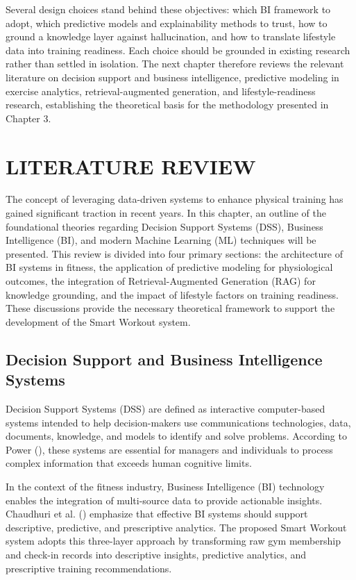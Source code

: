 \documentclass{aitthesis}
\begin{document}
Several design choices stand behind these objectives: which BI framework to adopt, which predictive models and explainability methods to trust, how to ground a knowledge layer against hallucination, and how to translate lifestyle data into training readiness. Each choice should be grounded in existing research rather than settled in isolation. The next chapter therefore reviews the relevant literature on decision support and business intelligence, predictive modeling in exercise analytics, retrieval-augmented generation, and lifestyle-readiness research, establishing the theoretical basis for the methodology presented in Chapter 3.

\chapter{LITERATURE REVIEW}

The concept of leveraging data-driven systems to enhance physical training has gained significant traction in recent years. In this chapter, an outline of the foundational theories regarding Decision Support Systems (DSS), Business Intelligence (BI), and modern Machine Learning (ML) techniques will be presented. This review is divided into four primary sections: the architecture of BI systems in fitness, the application of predictive modeling for physiological outcomes, the integration of Retrieval-Augmented Generation (RAG) for knowledge grounding, and the impact of lifestyle factors on training readiness. These discussions provide the necessary theoretical framework to support the development of the Smart Workout system.

\section{Decision Support and Business Intelligence Systems}

Decision Support Systems (DSS) are defined as interactive computer-based systems intended to help decision-makers use communications technologies, data, documents, knowledge, and models to identify and solve problems. According to Power (\citeyear{power2002}), these systems are essential for managers and individuals to process complex information that exceeds human cognitive limits.

In the context of the fitness industry, Business Intelligence (BI) technology enables the integration of multi-source data to provide actionable insights. Chaudhuri et al. (\citeyear{chaudhuri2011}) emphasize that effective BI systems should support descriptive, predictive, and prescriptive analytics. The proposed Smart Workout system adopts this three-layer approach by transforming raw gym membership and check-in records into descriptive insights, predictive analytics, and prescriptive training recommendations.
\end{document}
